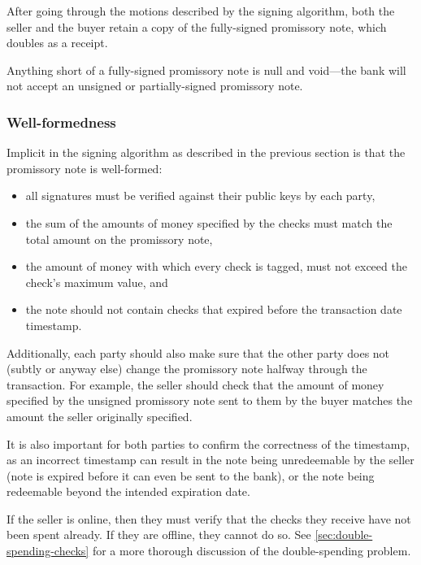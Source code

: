 \documentclass[12pt,a4paper]{article}
\begin{document}
	\newpage
	\begin{multicols}{2}

	After going through the motions described by the signing algorithm, both the seller and the buyer retain a copy of the fully-signed promissory note, which doubles as a receipt.
	
	Anything short of a fully-signed promissory note is null and void---the bank will not accept an unsigned or partially-signed promissory note.
	
	\subsubsection{Well-formedness}

	Implicit in the signing algorithm as described in the previous section is that the promissory note is well-formed:
	
	\begin{itemize}
		\item all signatures must be verified against their public keys by each party,
		\item the sum of the amounts of money specified by the checks must match the total amount on the promissory note,
		\item the amount of money with which every check is tagged, must not exceed the check's maximum value, and
		\item the note should not contain checks that expired before the transaction date timestamp.
	\end{itemize}

	Additionally, each party should also make sure that the other party does not (subtly or anyway else) change the promissory note halfway through the transaction. For example, the seller should check that the amount of money specified by the unsigned promissory note sent to them by the buyer matches the amount the seller originally specified.
	
	It is also important for both parties to confirm the correctness of the timestamp, as an incorrect timestamp can result in the note being unredeemable by the seller (note is expired before it can even be sent to the bank), or the note being redeemable beyond the intended expiration date.
	
	If the seller is online, then they must verify that the checks they receive have not been spent already. If they are offline, they cannot do so. See \autoref{sec:double-spending-checks} for a more thorough discussion of the double-spending problem.


\end{multicols}
\end{document}
